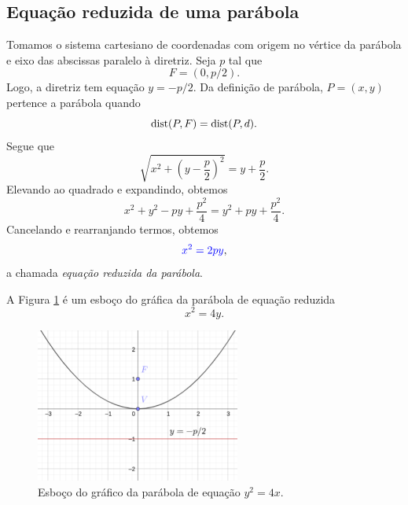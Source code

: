 \subsection{Equação reduzida de uma parábola}

Tomamos o sistema cartesiano de coordenadas com origem no vértice da parábola e eixo das abscissas paralelo à diretriz. Seja $p$ tal que
\begin{equation}
  F = (0, p/2).
\end{equation}
Logo, a diretriz tem equação $y = -p/2$. Da definição de parábola, $P=(x,y)$ pertence a parábola quando
\begin{equation}
  \operatorname{dist}(P, F) = \operatorname{dist}(P, d).
\end{equation}
Segue que
\begin{equation}
  \sqrt{x^2+\left(y-\frac{p}{2}\right)^2} = y+\frac{p}{2}.
\end{equation}
Elevando ao quadrado e expandindo, obtemos
\begin{equation}
  x^2 + y^2-py+\frac{p^2}{4} = y^2 + py + \frac{p^2}{4}.
\end{equation}
Cancelando e rearranjando termos, obtemos
\begin{equation}
  {\color{blue}x^2 = 2py},
\end{equation}
a chamada \emph{equação reduzida da parábola}.

\begin{ex}
  A Figura \ref{fig:parabola_ex} é um esboço do gráfica da parábola de equação reduzida
  \begin{equation}
    x^2 = 4y.
  \end{equation}

  \begin{figure}[H]
    \centering
    \includegraphics[width=0.6\textwidth]{cap_conicas/dados/fig_parabola_ex/fig}
    \caption{Esboço do gráfico da parábola de equação $y^2 = 4x$.}
    \label{fig:parabola_ex}
  \end{figure}
\end{ex}

